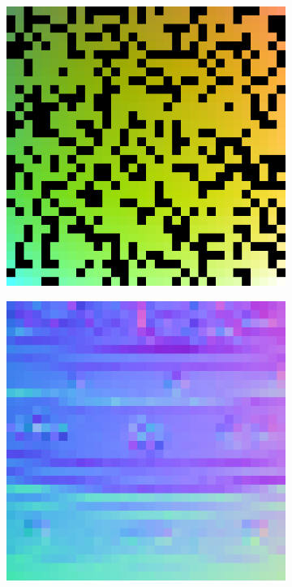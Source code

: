 \begin{figure}
	\begin{subfigure}[b]{0.24\linewidth}
		\includegraphics[width=\linewidth]{./Figures/gcnn_synthetic/eval_2_input.png}
	\end{subfigure}
	\begin{subfigure}[b]{0.24\linewidth}
		\includegraphics[width=\linewidth]{./Figures/gcnn_synthetic/eval_2_normal_GT.png}

\end{subfigure}
\end{figure}
